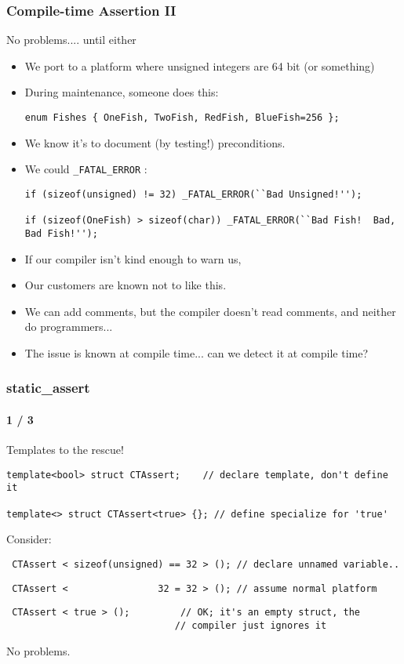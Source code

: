 \begin{frame}[fragile,t]
\frametitle{Compile-time Assertion II}


No problems.... until either


\begin{itemize}[<+->]
\item We port to a platform where unsigned integers are 64 bit (or
  something)
\item During maintenance, someone does this:
{\scriptsize\begin{verbatim}
enum Fishes { OneFish, TwoFish, RedFish, BlueFish=256 };
\end{verbatim}
}

\item We know it's  to document (by testing!)
  preconditions.
\item We could \texttt{\_FATAL\_ERROR} :
{\scriptsize\begin{verbatim}
if (sizeof(unsigned) != 32) _FATAL_ERROR(``Bad Unsigned!'');

if (sizeof(OneFish) > sizeof(char)) _FATAL_ERROR(``Bad Fish!  Bad, Bad Fish!'');
\end{verbatim}
}
\item If our compiler isn't kind enough to warn us, 
\item Our customers are known not to like this.
\item We can add comments, but the compiler doesn't read comments, and
  neither do programmers...
\item The issue is known at compile time... can we detect it at
  compile time?
\end{itemize}


\end{frame}


\begin{frame}[fragile,t]
\frametitle{static\_assert}
\framesubtitle{1 / 3}
Templates to the rescue!
{\scriptsize\begin{verbatim}
template<bool> struct CTAssert;    // declare template, don't define it

template<> struct CTAssert<true> {}; // define specialize for 'true'
\end{verbatim}
}

\pause
Consider:
{\scriptsize\begin{verbatim}
 CTAssert < sizeof(unsigned) == 32 > (); // declare unnamed variable..
\end{verbatim}
}
\pause
{\scriptsize\begin{verbatim}
 CTAssert <                32 = 32 > (); // assume normal platform
\end{verbatim}
}
\pause
{\scriptsize\begin{verbatim}
 CTAssert < true > ();         // OK; it's an empty struct, the
                              // compiler just ignores it
\end{verbatim}
}

No problems.

\end{frame}

